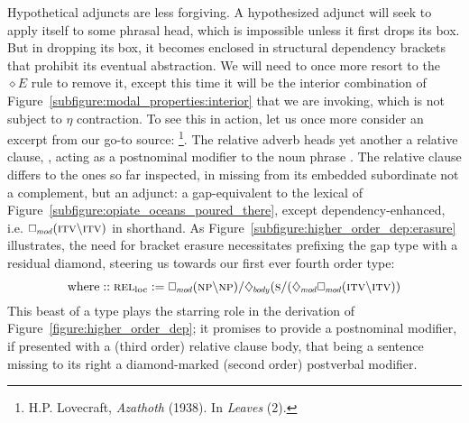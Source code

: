 Hypothetical adjuncts are less forgiving.
A hypothesized adjunct will seek to apply itself to some phrasal head, which is impossible unless it first drops its box.
But in dropping its box, it becomes enclosed in structural dependency brackets that prohibit its eventual abstraction.
We will need to once more resort to the $\diamond E$ rule to remove it, except this time it will be the interior combination of Figure~\ref{subfigure:modal_properties:interior} that we are invoking, which is not subject to $\eta$ contraction.
To see this in action, let us once more consider an excerpt from our go-to source: %
\footnote{H.P. Lovecraft, \textit{Azathoth} (1938). In \textit{Leaves} (2).}.
The relative adverb  heads yet another a relative clause, , acting as a postnominal modifier to the noun phrase .
The relative clause differs to the ones so far inspected, in missing from its embedded subordinate  not a complement, but an adjunct: a gap-equivalent to the lexical  of Figure~\ref{subfigure:opiate_oceans_poured_there}, except dependency-enhanced, i.e. $\dbox{mod}(\smallgtype{itv}\divleft\smallgtype{itv})$ in shorthand.
As Figure~\ref{subfigure:higher_order_dep:erasure} illustrates, the need for bracket erasure necessitates prefixing the gap type with a residual diamond, steering us towards our first ever fourth order type:
\begin{equation}
\text{where} :: \subcat{l}{rel}{loc} := \dbox{mod}(\np\divleft\np)\divright\ddia{body}(\s\divright(\ddia{mod}\dbox{mod}(\smallgtype{itv}\divleft\smallgtype{itv}))
\end{equation} 
This beast of a type plays the starring role in the derivation of Figure~\ref{figure:higher_order_dep}; it promises to provide a postnominal modifier, if presented with a (third order) relative clause body, that being a sentence missing to its right a diamond-marked (second order) postverbal modifier.

